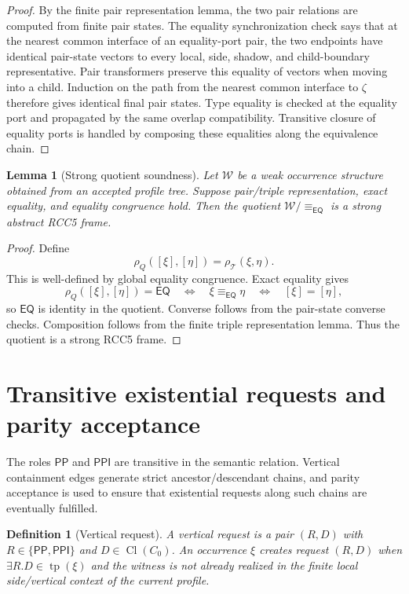 \documentclass[11pt]{article}
\newtheorem{lemma}[theorem]{Lemma}
\newtheorem{definition}[theorem]{Definition}
\newcommand{\EQ}{\mathsf{EQ}}
\newcommand{\PP}{\mathsf{PP}}
\newcommand{\PPI}{\mathsf{PPI}}
\newcommand{\Cl}{\operatorname{Cl}}
\newcommand{\tp}{\operatorname{tp}}
\newcommand{\eqE}{\equiv_{\EQ}}
\begin{document}
\begin{proof}
By the finite pair representation lemma, the two pair relations are computed from finite pair states.  The equality synchronization check says that at the nearest common interface of an equality-port pair, the two endpoints have identical pair-state vectors to every local, side, shadow, and child-boundary representative.  Pair transformers preserve this equality of vectors when moving into a child.  Induction on the path from the nearest common interface to $\zeta$ therefore gives identical final pair states.  Type equality is checked at the equality port and propagated by the same overlap compatibility.  Transitive closure of equality ports is handled by composing these equalities along the equivalence chain.
\end{proof}

\begin{lemma}[Strong quotient soundness]
Let $\mathcal W$ be a weak occurrence structure obtained from an accepted profile tree.  Suppose pair/triple representation, exact equality, and equality congruence hold.  Then the quotient $\mathcal W/{\eqE}$ is a strong abstract RCC5 frame.
\end{lemma}

\begin{proof}
Define
\[
  \rho_Q([\xi],[\eta])=\rho_\mathcal T(\xi,\eta).
\]
This is well-defined by global equality congruence.  Exact equality gives
\[
  \rho_Q([\xi],[\eta])=\EQ
  \quad\Longleftrightarrow\quad
  \xi\eqE\eta
  \quad\Longleftrightarrow\quad
  [\xi]=[\eta],
\]
so $\EQ$ is identity in the quotient.  Converse follows from the pair-state converse checks.  Composition follows from the finite triple representation lemma.  Thus the quotient is a strong RCC5 frame.
\end{proof}

\section{Transitive existential requests and parity acceptance}

The roles $\PP$ and $\PPI$ are transitive in the semantic relation.  Vertical containment edges generate strict ancestor/descendant chains, and parity acceptance is used to ensure that existential requests along such chains are eventually fulfilled.

\begin{definition}[Vertical request]
A vertical request is a pair $(R,D)$ with $R\in\{\PP,\PPI\}$ and $D\in\Cl(C_0)$.  An occurrence $\xi$ creates request $(R,D)$ when $\exists R.D\in\tp(\xi)$ and the witness is not already realized in the finite local side/vertical context of the current profile.
\end{definition}
\end{document}
